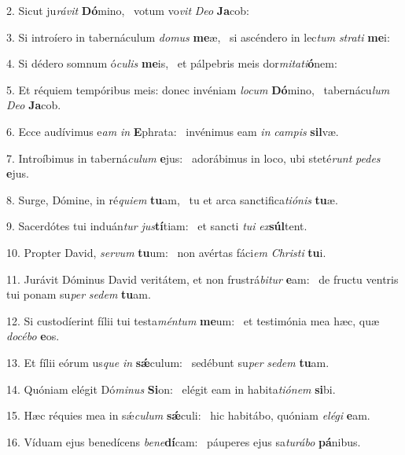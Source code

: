 2. Sicut ju\textit{rá}\textit{vit} \textbf{Dó}mino, \ast\  votum vo\textit{vit} \textit{De}\textit{o} \textbf{Ja}cob:\

3. Si introíero in tabernáculum \textit{do}\textit{mus} \textbf{me}æ, \ast\  si ascéndero in lec\textit{tum} \textit{stra}\textit{ti} \textbf{me}i:\

4. Si dédero somnum ó\textit{cu}\textit{lis} \textbf{me}is, \ast\  et pálpebris meis dor\textit{mi}\textit{ta}\textit{ti}\textbf{ó}nem:\

5. Et réquiem tempóribus meis: donec invéniam \textit{lo}\textit{cum} \textbf{Dó}mino, \ast\  tabernácu\textit{lum} \textit{De}\textit{o} \textbf{Ja}cob.\

6. Ecce audívimus e\textit{am} \textit{in} \textbf{E}phrata: \ast\  invénimus eam \textit{in} \textit{cam}\textit{pis} \textbf{sil}væ.\

7. Introíbimus in taberná\textit{cu}\textit{lum} \textbf{e}jus: \ast\  adorábimus in loco, ubi steté\textit{runt} \textit{pe}\textit{des} \textbf{e}jus.\

8. Surge, Dómine, in ré\textit{qui}\textit{em} \textbf{tu}am, \ast\  tu et arca sanctifica\textit{ti}\textit{ó}\textit{nis} \textbf{tu}æ.\

9. Sacerdótes tui induán\textit{tur} \textit{jus}\textbf{tí}tiam: \ast\  et sancti \textit{tu}\textit{i} \textit{ex}\textbf{súl}tent.\

10. Propter David, \textit{ser}\textit{vum} \textbf{tu}um: \ast\  non avértas fáci\textit{em} \textit{Chris}\textit{ti} \textbf{tu}i.\

11. Jurávit Dóminus David veritátem, et non frustrá\textit{bi}\textit{tur} \textbf{e}am: \ast\  de fructu ventris tui ponam su\textit{per} \textit{se}\textit{dem} \textbf{tu}am.\

12. Si custodíerint fílii tui testa\textit{mén}\textit{tum} \textbf{me}um: \ast\  et testimónia mea hæc, quæ \textit{do}\textit{cé}\textit{bo} \textbf{e}os.\

13. Et fílii eórum us\textit{que} \textit{in} \textbf{sǽ}culum: \ast\  sedébunt su\textit{per} \textit{se}\textit{dem} \textbf{tu}am.\

14. Quóniam elégit Dó\textit{mi}\textit{nus} \textbf{Si}on: \ast\  elégit eam in habita\textit{ti}\textit{ó}\textit{nem} \textbf{si}bi.\

15. Hæc réquies mea in sǽ\textit{cu}\textit{lum} \textbf{sǽ}culi: \ast\  hic habitábo, quóniam \textit{e}\textit{lé}\textit{gi} \textbf{e}am.\

16. Víduam ejus benedícens \textit{be}\textit{ne}\textbf{dí}cam: \ast\  páuperes ejus sa\textit{tu}\textit{rá}\textit{bo} \textbf{pá}nibus.\

